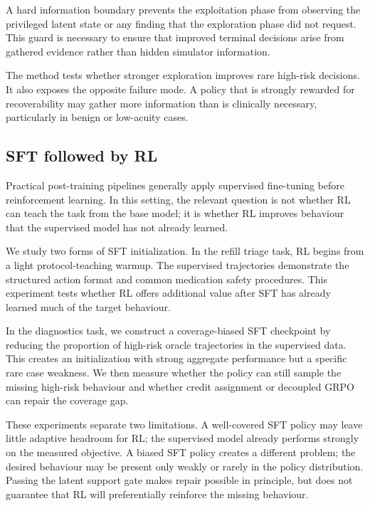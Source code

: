 \documentclass{article}
\begin{document}
A hard information boundary prevents the exploitation phase from observing the
privileged latent state or any finding that the exploration phase did not request.
This guard is necessary to ensure that improved terminal decisions arise from
gathered evidence rather than hidden simulator information.

The method tests whether stronger exploration improves rare high-risk decisions.
It also exposes the opposite failure mode. A policy that is strongly rewarded for
recoverability may gather more information than is clinically necessary,
particularly in benign or low-acuity cases.

\subsection{SFT followed by RL}
\label{subsec:sft-rl}

Practical post-training pipelines generally apply supervised fine-tuning before
reinforcement learning. In this setting, the relevant question is not whether RL
can teach the task from the base model; it is whether RL improves behaviour that
the supervised model has not already learned.

We study two forms of SFT initialization. In the refill triage task, RL begins from
a light protocol-teaching warmup. The supervised trajectories demonstrate the
structured action format and common medication safety procedures. This experiment
tests whether RL offers additional value after SFT has already learned much of the
target behaviour.

In the diagnostics task, we construct a coverage-biased SFT checkpoint by reducing
the proportion of high-risk oracle trajectories in the supervised data. This
creates an initialization with strong aggregate performance but a specific rare
case weakness. We then measure whether the policy can still sample the missing high-risk behaviour and whether credit assignment or decoupled GRPO can repair the
coverage gap.

These experiments separate two limitations. A well-covered SFT policy may leave
little adaptive headroom for RL; the supervised model already performs strongly on
the measured objective. A biased SFT policy creates a different problem; the
desired behaviour may be present only weakly or rarely in the policy distribution.
Passing the latent support gate makes repair possible in principle, but does not
guarantee that RL will preferentially reinforce the missing behaviour.
\end{document}
